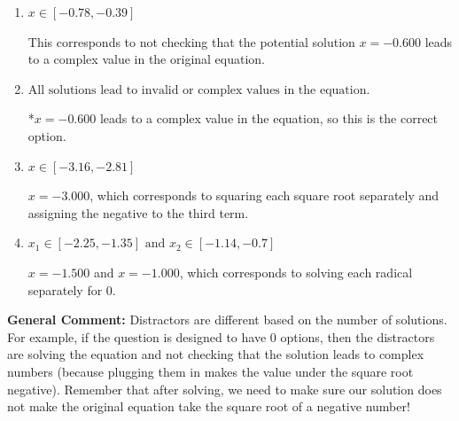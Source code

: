 \documentclass{extbook}[14pt]
\begin{document}
\begin{enumerate}
{\begin{enumerate}[label=\Alph*.]
$x = -1.000$ and $x = -0.600$, which corresponds to solving the equation correctly and including the value that makes the first square root 0.
\item \( x \in [-0.78,-0.39] \)

This corresponds to not checking that the potential solution $x = -0.600$ leads to a complex value in the original equation.
\item \( \text{All solutions lead to invalid or complex values in the equation.} \)

*$x = -0.600$ leads to a complex value in the equation, so this is the correct option.
\item \( x \in [-3.16,-2.81] \)

$x = -3.000$, which corresponds to squaring each square root separately and assigning the negative to the third term.
\item \( x_1 \in [-2.25, -1.35] \text{ and } x_2 \in [-1.14,-0.7] \)

$x = -1.500$ and $x = -1.000$, which corresponds to solving each radical separately for 0.
\end{enumerate}

\textbf{General Comment:} Distractors are different based on the number of solutions. For example, if the question is designed to have 0 options, then the distractors are solving the equation and not checking that the solution leads to complex numbers (because plugging them in makes the value under the square root negative). Remember that after solving, we need to make sure our solution does not make the original equation take the square root of a negative number!
}
\end{enumerate}
\end{document}
